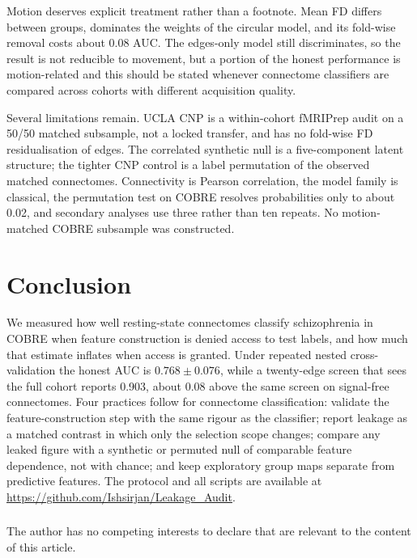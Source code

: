 \documentclass[runningheads]{llncs}
\begin{document}
Motion deserves explicit treatment rather than a footnote. Mean FD differs between groups,
dominates the weights of the circular model, and its fold-wise removal costs about 0.08
AUC. The edges-only model still discriminates, so the result is not reducible to movement,
but a portion of the honest performance is motion-related and this should be stated
whenever connectome classifiers are compared across cohorts with different acquisition
quality.

Several limitations remain. UCLA CNP is a within-cohort fMRIPrep audit on a 50/50
matched subsample, not a locked transfer, and has no fold-wise FD residualisation of
edges. The correlated synthetic null is a five-component latent structure; the tighter
CNP control is a label permutation of the observed matched connectomes. Connectivity is
Pearson correlation, the model family is classical, the permutation test on COBRE
resolves probabilities only to about 0.02, and secondary analyses use three rather than
ten repeats. No motion-matched COBRE subsample was constructed.

\section{Conclusion}

We measured how well resting-state connectomes classify schizophrenia in COBRE when
feature construction is denied access to test labels, and how much that estimate inflates
when access is granted. Under repeated nested cross-validation the honest AUC is
$0.768 \pm 0.076$, while a twenty-edge screen that sees the full cohort reports 0.903,
about 0.08 above the same screen on signal-free connectomes. Four practices follow for
connectome classification: validate the feature-construction step with the same rigour
as the classifier; report leakage as a matched contrast in which only the selection scope
changes; compare any leaked figure with a synthetic or permuted null of comparable
feature dependence, not with chance; and keep exploratory group maps separate from
predictive features. The protocol and all scripts are
available at \url{https://github.com/Ishsirjan/Leakage_Audit}.

\begin{credits}
\subsubsection{\discintname}
The author has no competing interests to declare that are relevant to the content of this
article.
\end{credits}



\end{document}
